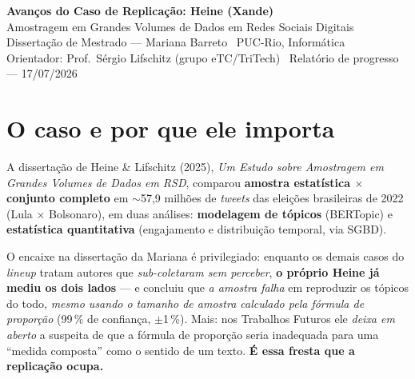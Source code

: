 \documentclass[11pt,a4paper]{article}
\begin{document}
\begin{center}
{\LARGE\bfseries\color{puc} Avanços do Caso de Replicação: Heine (Xande)}\\[2pt]
{\large Amostragem em Grandes Volumes de Dados em Redes Sociais Digitais}\\[6pt]
{\normalsize Dissertação de Mestrado — Mariana Barreto \textbullet\ PUC-Rio, Informática}\\
{\small Orientador: Prof.\ Sérgio Lifschitz (grupo eTC/TriTech) \textbullet\ Relatório de progresso — 17/07/2026}
\end{center}

\vspace{2pt}
\noindent{}

\section{O caso e por que ele importa}

A dissertação de Heine \& Lifschitz (2025), \emph{Um Estudo sobre Amostragem em Grandes
Volumes de Dados em RSD}, comparou \textbf{amostra estatística $\times$ conjunto completo}
em $\sim$57,9 milhões de \emph{tweets} das eleições brasileiras de 2022 (Lula $\times$
Bolsonaro), em duas análises: \textbf{modelagem de tópicos} (BERTopic) e \textbf{estatística
quantitativa} (engajamento e distribuição temporal, via SGBD).

O encaixe na dissertação da Mariana é privilegiado: enquanto os demais casos do
\emph{lineup} tratam autores que \emph{sub-coletaram sem perceber}, \textbf{o próprio Heine
já mediu os dois lados} — e concluiu que \emph{a amostra falha} em reproduzir os tópicos do
todo, \emph{mesmo usando o tamanho de amostra calculado pela fórmula de proporção}
(99\,\% de confiança, $\pm$1\,\%). Mais: nos Trabalhos Futuros ele \emph{deixa em aberto} a
suspeita de que a fórmula de proporção seria inadequada para uma ``medida composta'' como o
sentido de um texto. \textbf{É essa fresta que a replicação ocupa.}
\end{document}
